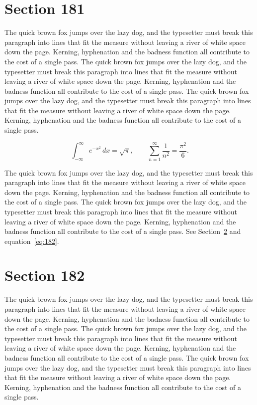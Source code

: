 \documentclass{article}
\begin{document}
\section{Section 181}
\label{sec:181}
The quick brown fox jumps over the lazy dog, and the typesetter must break this paragraph into lines that fit the measure without leaving a river of white space down the page. Kerning, hyphenation and the badness function all contribute to the cost of a single pass. The quick brown fox jumps over the lazy dog, and the typesetter must break this paragraph into lines that fit the measure without leaving a river of white space down the page. Kerning, hyphenation and the badness function all contribute to the cost of a single pass. The quick brown fox jumps over the lazy dog, and the typesetter must break this paragraph into lines that fit the measure without leaving a river of white space down the page. Kerning, hyphenation and the badness function all contribute to the cost of a single pass. 

\begin{equation}\label{eq:181}
\int_{-\infty}^{\infty} e^{-x^{2}}\,dx = \sqrt{\pi}, \qquad
\sum_{n=1}^{\infty} \frac{1}{n^{2}} = \frac{\pi^{2}}{6}.
\end{equation}

The quick brown fox jumps over the lazy dog, and the typesetter must break this paragraph into lines that fit the measure without leaving a river of white space down the page. Kerning, hyphenation and the badness function all contribute to the cost of a single pass. The quick brown fox jumps over the lazy dog, and the typesetter must break this paragraph into lines that fit the measure without leaving a river of white space down the page. Kerning, hyphenation and the badness function all contribute to the cost of a single pass. 
See Section~\ref{sec:182} and equation~\eqref{eq:182}.
\section{Section 182}
\label{sec:182}
The quick brown fox jumps over the lazy dog, and the typesetter must break this paragraph into lines that fit the measure without leaving a river of white space down the page. Kerning, hyphenation and the badness function all contribute to the cost of a single pass. The quick brown fox jumps over the lazy dog, and the typesetter must break this paragraph into lines that fit the measure without leaving a river of white space down the page. Kerning, hyphenation and the badness function all contribute to the cost of a single pass. The quick brown fox jumps over the lazy dog, and the typesetter must break this paragraph into lines that fit the measure without leaving a river of white space down the page. Kerning, hyphenation and the badness function all contribute to the cost of a single pass. 
\end{document}
